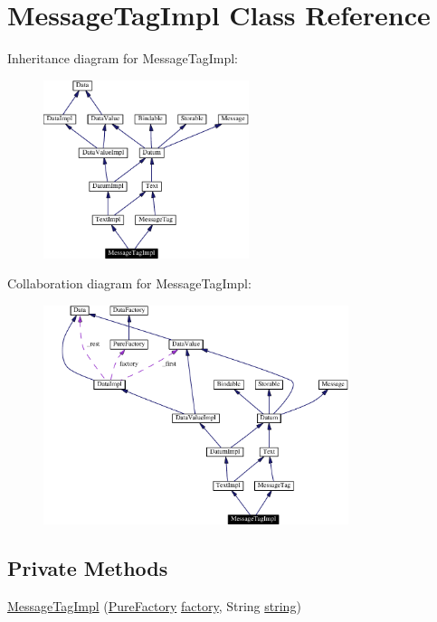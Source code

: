 \hypertarget{classMessageTagImpl}{
\section{Message\-Tag\-Impl  Class Reference}
\label{classMessageTagImpl}
}
Inheritance diagram for Message\-Tag\-Impl:\begin{figure}[H]
\begin{center}
\leavevmode
\includegraphics[width=170pt]{classMessageTagImpl__inherit__graph}
\end{center}
\end{figure}
Collaboration diagram for Message\-Tag\-Impl:\begin{figure}[H]
\begin{center}
\leavevmode
\includegraphics[width=253pt]{classMessageTagImpl__coll__graph}
\end{center}
\end{figure}
\subsection*{Private Methods}
\begin{CompactItemize}
\item 
\hyperlink{classMessageTagImpl_c0}{Message\-Tag\-Impl} (\hyperlink{classPureFactory}{Pure\-Factory} \hyperlink{classDataImpl_o0}{factory}, String \hyperlink{classTextImpl_o0}{string})
\end{CompactItemize}


